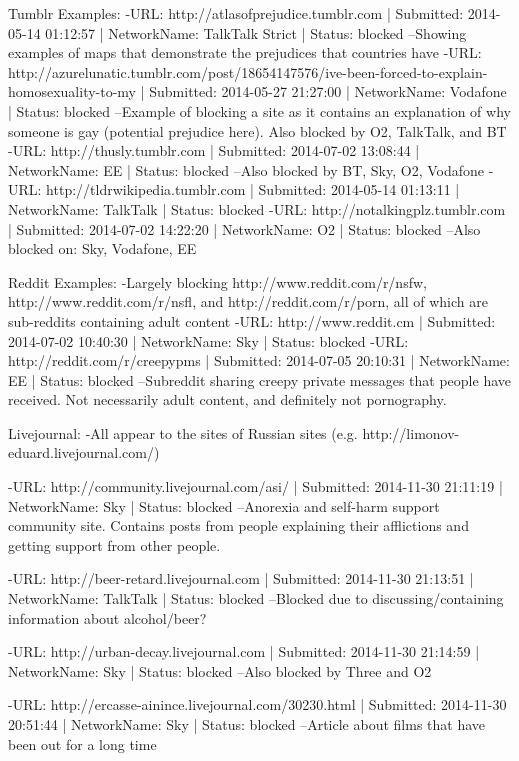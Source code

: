\documentclass{bmcart}
\begin{document}
Tumblr Examples:
-URL: http://atlasofprejudice.tumblr.com | Submitted: 2014-05-14 01:12:57 | NetworkName: TalkTalk Strict | Status: blocked
--Showing examples of maps that demonstrate the prejudices that countries have
-URL: http://azurelunatic.tumblr.com/post/18654147576/ive-been-forced-to-explain-homosexuality-to-my | Submitted: 2014-05-27 21:27:00 | NetworkName: Vodafone | Status: blocked
--Example of blocking a site as it contains an explanation of why someone is gay (potential prejudice here). Also blocked by O2, TalkTalk, and BT
-URL: http://thusly.tumblr.com | Submitted: 2014-07-02 13:08:44 | NetworkName: EE | Status: blocked
--Also blocked by BT, Sky, O2, Vodafone
-URL: http://tldrwikipedia.tumblr.com | Submitted: 2014-05-14 01:13:11 | NetworkName: TalkTalk | Status: blocked
-URL: http://notalkingplz.tumblr.com | Submitted: 2014-07-02 14:22:20 | NetworkName: O2 | Status: blocked
--Also blocked on: Sky, Vodafone, EE


Reddit Examples:
-Largely blocking http://www.reddit.com/r/nsfw, http://www.reddit.com/r/nsfl, and http://reddit.com/r/porn, all of which are sub-reddits containing adult content
-URL: http://www.reddit.cm | Submitted: 2014-07-02 10:40:30 | NetworkName: Sky | Status: blocked
-URL: http://reddit.com/r/creepypms | Submitted: 2014-07-05 20:10:31 | NetworkName: EE | Status: blocked
--Subreddit sharing creepy private messages that people have received. Not necessarily adult content, and definitely not pornography.


Livejournal:
-All appear to the sites of Russian sites (e.g. http://limonov-eduard.livejournal.com/)

-URL: http://community.livejournal.com/asi/ | Submitted: 2014-11-30 21:11:19 | NetworkName: Sky | Status: blocked
--Anorexia and self-harm support community site. Contains posts from people explaining their afflictions and getting support from other people.

-URL: http://beer-retard.livejournal.com | Submitted: 2014-11-30 21:13:51 | NetworkName: TalkTalk | Status: blocked
--Blocked due to discussing/containing information about alcohol/beer?

-URL: http://urban-decay.livejournal.com | Submitted: 2014-11-30 21:14:59 | NetworkName: Sky | Status: blocked
--Also blocked by Three and O2

-URL: http://ercasse-ainince.livejournal.com/30230.html | Submitted: 2014-11-30 20:51:44 | NetworkName: Sky | Status: blocked
--Article about films that have been out for a long time
\end{document}
